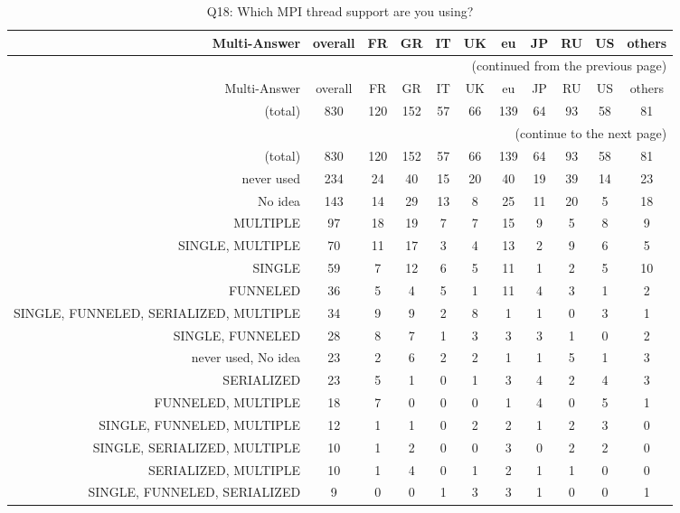 \clearpage%
{\footnotesize\begin{landscape}%
\begin{longtable}[htb]{r|c|c|c|c|c|c|c|c|c|c}%
\caption{Q18: Which MPI thread support are you using?}%
\label{tab:Q18-mans} \\%
\hline%
Multi-Answer & overall & FR & GR & IT & UK & eu & JP & RU & US & others \\
 \hline%
\endfirsthead%
\multicolumn{11}{r}{(continued from the previous page)}\\%
\hline%
Multi-Answer & overall & FR & GR & IT & UK & eu & JP & RU & US & others \\
 \hline%
\endhead%
\hline%
(total) & 830 & 120 & 152 & 57 & 66 & 139 & 64 & 93 & 58 & 81 \\%
\hline%
\multicolumn{11}{r}{(continue to the next page)}\\%
\endfoot%
\hline%
(total) & 830 & 120 & 152 & 57 & 66 & 139 & 64 & 93 & 58 & 81 \\%
\hline%
\endlastfoot%
\hline%
{never used} & 234 & 24 & 40 & 15 & 20 & 40 & 19 & 39 & 14 & 23 \\%
{No idea} & 143 & 14 & 29 & 13 & 8 & 25 & 11 & 20 & 5 & 18 \\%
{MULTIPLE} & 97 & 18 & 19 & 7 & 7 & 15 & 9 & 5 & 8 & 9 \\%
{SINGLE, MULTIPLE} & 70 & 11 & 17 & 3 & 4 & 13 & 2 & 9 & 6 & 5 \\%
{SINGLE} & 59 & 7 & 12 & 6 & 5 & 11 & 1 & 2 & 5 & 10 \\%
{FUNNELED} & 36 & 5 & 4 & 5 & 1 & 11 & 4 & 3 & 1 & 2 \\%
{SINGLE, FUNNELED, SERIALIZED, MULTIPLE} & 34 & 9 & 9 & 2 & 8 & 1 & 1 & 0 & 3 & 1 \\%
{SINGLE, FUNNELED} & 28 & 8 & 7 & 1 & 3 & 3 & 3 & 1 & 0 & 2 \\%
{never used, No idea} & 23 & 2 & 6 & 2 & 2 & 1 & 1 & 5 & 1 & 3 \\%
{SERIALIZED} & 23 & 5 & 1 & 0 & 1 & 3 & 4 & 2 & 4 & 3 \\%
{FUNNELED, MULTIPLE} & 18 & 7 & 0 & 0 & 0 & 1 & 4 & 0 & 5 & 1 \\%
{SINGLE, FUNNELED, MULTIPLE} & 12 & 1 & 1 & 0 & 2 & 2 & 1 & 2 & 3 & 0 \\%
{SINGLE, SERIALIZED, MULTIPLE} & 10 & 1 & 2 & 0 & 0 & 3 & 0 & 2 & 2 & 0 \\%
{SERIALIZED, MULTIPLE} & 10 & 1 & 4 & 0 & 1 & 2 & 1 & 1 & 0 & 0 \\%
{SINGLE, FUNNELED, SERIALIZED} & 9 & 0 & 0 & 1 & 3 & 3 & 1 & 0 & 0 & 1 \\%

\end{longtable}
\end{landscape}}
